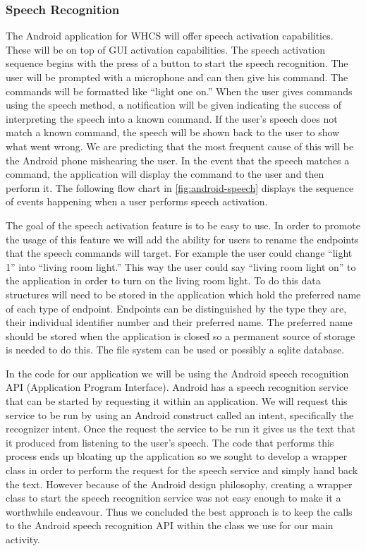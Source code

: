 \subsubsection{Speech Recognition} The Android application for WHCS will offer
speech activation capabilities. These will be on top of GUI activation
capabilities. The speech activation sequence begins with the press of a button
to start the speech recognition. The user will be prompted with a microphone
and can then give his command. The commands will be formatted like {}``light
one on.'' When the user gives commands using the speech method, a notification
will be given indicating the success of interpreting the speech into a known
command. If the user{}'s speech does not match a known command, the speech will
be shown back to the user to show what went wrong. We are predicting that the
most frequent cause of this will be the Android phone mishearing the user. In
the event that the speech matches a command, the application will display the
command to the user and then perform it. The following flow chart in
\autoref{fig:android-speech} displays the sequence of events happening when a
user performs speech activation.


The goal of the speech activation feature is to be easy to use. In order to
promote the usage of this feature we will add the ability for users to rename
the endpoints that the speech commands will target. For example the user could
change {}``light 1'' into {}``living room light.'' This way the user could say
{}``living room light on{}'' to the application in order to turn on the living
room light. To do this data structures will need to be stored in the
application which hold the preferred name of each type of endpoint. Endpoints
can be distinguished by the type they are, their individual identifier number
and their preferred name. The preferred name should be stored when the
application is closed so a permanent source of storage is needed to do this.
The file system can be used or possibly a sqlite database.

In the code for our application we will be using the Android speech recognition
API (Application Program Interface).  Android has a speech recognition service
that can be started by requesting it within an application. We will request
this service to be run by using an Android construct called an intent,
specifically the recognizer intent. Once the request the service to be run it
gives us the text that it produced from listening to the user{}'s speech. The
code that performs this process ends up bloating up the application so we
sought to develop a wrapper class in order to perform the request for the
speech service and simply hand back the text. However because of the Android
design philosophy, creating a wrapper class to start the speech recognition
service was not easy enough to make it a worthwhile endeavour. Thus we
concluded the best approach is to keep the calls to the Android speech
recognition API within the class we use for our main activity.

